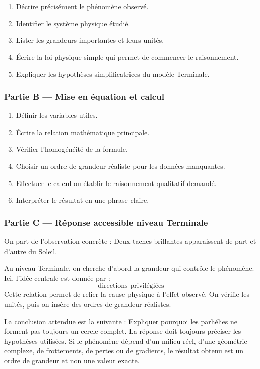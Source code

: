 \documentclass[11pt,a4paper]{article}
\begin{document}
\begin{enumerate}
  \item Décrire précisément le phénomène observé.
  \item Identifier le système physique étudié.
  \item Lister les grandeurs importantes et leurs unités.
  \item Écrire la loi physique simple qui permet de commencer le raisonnement.
  \item Expliquer les hypothèses simplificatrices du modèle Terminale.
\end{enumerate}

\subsubsection*{Partie B — Mise en équation et calcul}

\begin{enumerate}
  \item Définir les variables utiles.
  \item Écrire la relation mathématique principale.
  \item Vérifier l'homogénéité de la formule.
  \item Choisir un ordre de grandeur réaliste pour les données manquantes.
  \item Effectuer le calcul ou établir le raisonnement qualitatif demandé.
  \item Interpréter le résultat en une phrase claire.
\end{enumerate}

\subsubsection*{Partie C — Réponse accessible niveau Terminale}

\begin{corrigebox}
On part de l'observation concrète : Deux taches brillantes apparaissent de part et d'autre du Soleil.

Au niveau Terminale, on cherche d'abord la grandeur qui contrôle le phénomène. Ici, l'idée centrale est donnée par :
\[
\text{directions privilégiées}
\]
Cette relation permet de relier la cause physique à l'effet observé. On vérifie les unités, puis on insère des ordres de grandeur réalistes.

La conclusion attendue est la suivante : Expliquer pourquoi les parhélies ne forment pas toujours un cercle complet. La réponse doit toujours préciser les hypothèses utilisées. Si le phénomène dépend d'un milieu réel, d'une géométrie complexe, de frottements, de pertes ou de gradients, le résultat obtenu est un ordre de grandeur et non une valeur exacte.
\end{corrigebox}
\end{document}
